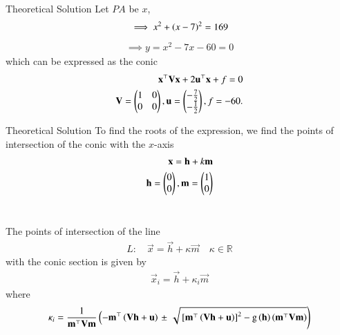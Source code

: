 \documentclass{beamer}
\begin{document}
\begin{frame}{Theoretical Solution}
Let $PA$ be $x$,
\begin{align}
\implies x^2 + \left(x - 7\right)^2 = 169
\end{align}
\begin{align}
\implies    y = x^2 - 7x - 60 = 0
\end{align}
which 
 can be expressed as the conic
\begin{align}
    \mathbf{x}^\top\mathbf{V}\mathbf{x} + 2\mathbf{u}^\top\mathbf{x} + f = 0 \\
    \mathbf{V} = \begin{pmatrix}1 & 0 \\ 0 & 0\end{pmatrix}, \mathbf{u} = \begin{pmatrix}-\frac{7}{2} \\ -\frac{1}{2}\end{pmatrix}, f = -60.
\end{align}

\end{frame}

\begin{frame}{Theoretical Solution}
To find the roots of the expression, we find the points of intersection of the conic with the $x$-axis 
\begin{align}
    \mathbf{x} = \mathbf{h} + k\mathbf{m} \\
    \mathbf{h} = \begin{pmatrix}0 \\ 0\end{pmatrix}, \mathbf{m} = \begin{pmatrix}1 \\ 0\end{pmatrix}
\end{align}\\
\bigskip 

The points of intersection of the line 
\begin{align}
L: \quad \vec{x} = \vec{h} + \kappa \vec{m} \quad \kappa \in \mathbb{R}
\label{eq:conic_tangent}
\end{align}
with the conic section is given by
\begin{align}
\vec{x}_i = \vec{h} + \kappa_i \vec{m}
	\label{eq:chord-pts}
\end{align}
%
where
\begin{multline}
\kappa_i = \frac{1}
{
\mathbf{m}^{\top}\mathbf{V}\mathbf{m}
}
\left(-\mathbf{m}^{\top}\left(\mathbf{V}\mathbf{h}+\mathbf{u}\right)\right.
\pm
\left.\sqrt{
{}\left[
\mathbf{m}^{\top}\left(\mathbf{V}\mathbf{h}+\mathbf{u}\right)
\right]^2
	-\text{g}
\left(\mathbf{h}
\right)
\left(\mathbf{m}^{\top}\mathbf{V}\mathbf{m}\right)
}
\right)
\label{eq:tangent_roots}
\end{multline}
\end{frame}
\end{document}
